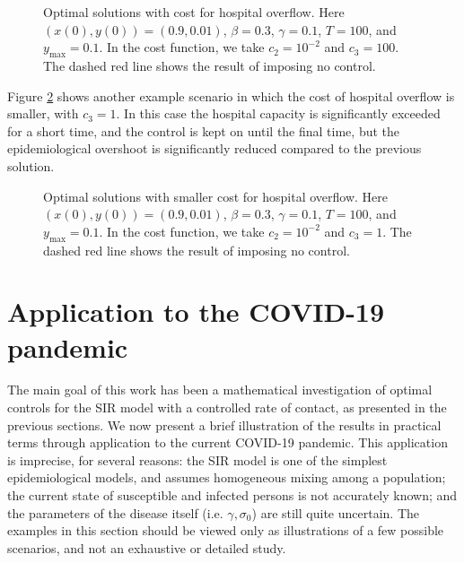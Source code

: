\documentclass[english,12pt,letter]{article}
\newcommand{\Rnot}{\sigma_0}
\newcommand{\ymax}{y_\text{max}}
\begin{document}
\begin{figure}
    \centering
    \caption{Optimal solutions with cost for hospital overflow.  Here $(x(0),y(0)) = (0.9,0.01)$, $\beta=0.3$, $\gamma=0.1$, $T=100$,
        and $\ymax=0.1$.
        In the cost function, we take $c_2=10^{-2}$ and $c_3=100$.
        The dashed red line shows the result of imposing no control.
        \label{fig:min_hosp_1}}
\end{figure}

Figure \ref{fig:min_hosp_2} shows another example scenario in which the cost of hospital overflow is smaller,
with $c_3=1$.  In this case the hospital capacity is significantly exceeded for a short time,
and the control is kept on until the final time, but the epidemiological overshoot
is significantly reduced compared to the previous solution.

\begin{figure}
    \centering
    \caption{Optimal solutions with smaller cost for hospital overflow.  Here $(x(0),y(0)) = (0.9,0.01)$, $\beta=0.3$, $\gamma=0.1$, $T=100$,
        and $\ymax=0.1$.
        In the cost function, we take $c_2=10^{-2}$ and $c_3=1$.
        The dashed red line shows the result of imposing no control.
        \label{fig:min_hosp_2}}
\end{figure}

\section{Application to the COVID-19 pandemic\label{sec:application}}
The main goal of this work has been a mathematical investigation of optimal
controls for the SIR model with a controlled rate of contact, as presented
in the previous sections.  We now present a brief illustration of the results
in practical terms through application to the current COVID-19 pandemic.
This application is imprecise, for several reasons:  the SIR model
is one of the simplest epidemiological models, and assumes homogeneous mixing
among a population; the current state of susceptible and infected persons is
not accurately known; and the parameters of the disease itself (i.e. $\gamma, \Rnot$)
are still quite uncertain.  
The examples in this section should be viewed only as illustrations
of a few possible scenarios, and not an exhaustive or detailed study.
\end{document}
